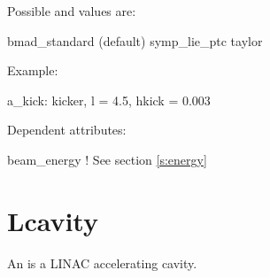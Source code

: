 \vskip0.2in \noindent
Possible  and  values are:
\vskip 0.01in
\begin{example}
  bmad\_standard (default)
  symp\_lie\_ptc
  taylor
\end{example}

\vskip0.2in \noindent
Example:
\begin{example}
  a_kick: kicker, l = 4.5, hkick = 0.003
\end{example}

\vskip0.2in \noindent
Dependent attributes:
\begin{example}
  beam\_energy  ! See section \ref{s:energy}
\end{example}

\section{Lcavity}
\label{s:lcav}

An  is a LINAC accelerating cavity.

